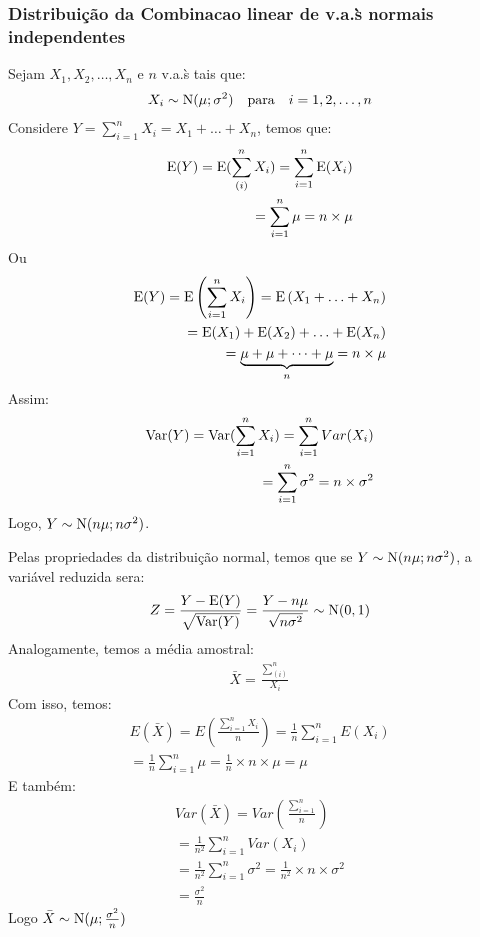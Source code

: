   \subsubsection{Distribuição da Combinacao linear de v.a.\`s normais independentes}
  \begin{description}
    \item Sejam $X_1, X_2 , \ldots, X_n $ e  $n$ v.a.\`s tais que:
  \begin{align*}
    X_i \sim \operatorname{N}(\mu ; \sigma^2)  \quad \text{para} \quad i=1,2,\ldots,n
  \end{align*}
  Considere $Y= \sum_{i=1}^{n} X_i = X_1+\ldots+X_n$, temos que:
  \begin{align*}
    \operatorname{E}(Y)  = \operatorname{E}( \sum \limits_{(i)}^{n} X_i ) = \sum_{i=1}^{n} \operatorname{E}(X_i) \\
    = \sum_{i=1}^{n} \mu = n \times \mu
  \end{align*}
  Ou
  \begin{align*}
    \operatorname{E}(Y )  =\operatorname{E}\left( \sum_{i=1}^n X_i \right)= \operatorname{E}\left(X_1 + \ldots +X_n\right) \\
    = \operatorname{E}(X_1) +\operatorname{E}(X_2) + \ldots +\operatorname{E}(X_n)\\
    =\underbrace{\mu + \mu + \dots + \mu}_{n} = n \times \mu
  \end{align*}
  Assim:
  \begin{align*}
    \operatorname{Var}(Y) = \operatorname{Var}(\sum_{i=1}^{n} X_i)= \sum^{n}_{i=1} Var(X_i) \\
    = \sum_{i=1}^{n} \sigma^2 = n  \times \sigma^2
  \end{align*}
  Logo, $Y \sim \operatorname{N}(n\mu ; n \sigma^2)$.

  Pelas propriedades da distribuição normal, temos que se $Y\sim \operatorname{N}(n\mu; n\sigma^2)$, 
  a variável reduzida sera:
  \begin{align*}
    Z= \frac{Y- \operatorname{E}(Y)}{\sqrt{\operatorname{Var}(Y)}} = \frac{Y- n\mu}{\sqrt{n\sigma^2}} \sim \operatorname{N}(0,1)
  \end{align*}
  Analogamente, temos a média amostral:
  \begin{align*}
    \bar{X} = \frac{\sum \limits_{(i)}^{n}}{X_i}
  \end{align*}
  Com isso, temos:
  \begin{align*}
    E(\bar{X}) = E( \frac{\sum_{i=1}^n X_i}{n} )= \frac{1}{n}\sum_{i=1}^{n} E(X_i) \\
    = \frac{1}{n} \sum_{i=1}^n \mu = \frac{1}{n} \times n \times \mu = \mu
  \end{align*}
  E também:
  \begin{align*}
    Var(\bar{X}) = Var(\frac{\sum_{i=1}^n}{n}) \\
    = \frac{1}{n^2} \sum_{i=1}^{n} Var(X_i) \\
    = \frac{1}{n^2} \sum_{i=1}^{n} \sigma^2 = \frac{1}{n^2} \times n \times \sigma^2 \\
    = \frac{\sigma^2}{n}
  \end{align*}
  Logo $\bar{X} \sim \operatorname{N} ( \mu ; \frac{\sigma^2}{n} ) $


\end{description}
